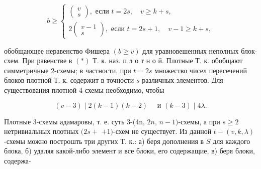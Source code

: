 \documentclass[10pt]{article}
\begin{document}
\[

b \geqslant\left\{\begin{array}{l}

\left(\begin{array}{c}

v \\

s

\end{array}\right), \text { если } t=2 s, \quad v \geqslant k+s, \\

2\left(\begin{array}{c}

v-1 \\

s

\end{array}\right), \text { если } t=2 s+1, \quad v-1 \geqslant k+s,

\end{array}\right.

\]



обобщающее неравенство Фишера $(b \geqslant v)$ для уравновешенных неполных блок-схем. При равенстве в $(*)$ Т. к. наз. п л о т н о й. Плотные Т. к. обобщают симметричные 2-схемы; в частности, при $t=2 s$ множество чисел пересечений блоков плотной Т. к. содержит в точности $s$ различных элементов. Для существования плотной 4-схемы необходимо, чтобы



\[

(v-3) \mid 2(k-1)(k-2) \quad \text { и }(k-3) \mid 4 \lambda .

\]



Плотные 3-схемы адамаровы, т. е. суть 3-(4n, $2 n$, $n-1)$-схемы, а при $s \geqslant 2$ нетривиальных плотных $(2 s+$ $+1)$-схем не существует. Из данной $t-(v, k, \lambda)$-схемы можно построшть три других Т. к.: а) беря дополнения в $S$ для каждого блока, б) удаляя какой-либо элемент и все блоки, его содержащие, в) беря блоки, содержа-
\end{document}
